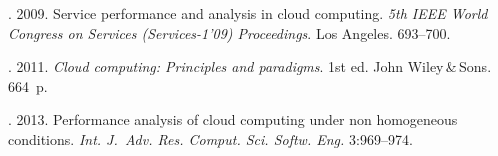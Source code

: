   \begin{multicols}{2}

\renewcommand{\bibname}{\protect\rmfamily References}

{\small\frenchspacing
 {%
 \begin{thebibliography}{99}

. 2009. 
Service performance and analysis in cloud computing. 
\textit{5th IEEE World Congress on Services (Services-1'09) Proceedings}. 
Los Angeles. 693--700.

. 2011. \textit{Cloud computing: 
Principles and paradigms}. 1st ed. John Wiley\,\&\,Sons. 664~p.

. 
2013. Performance analysis of cloud computing under non homogeneous conditions. 
\textit{Int. J.~Adv. Res. Comput. Sci. Softw. Eng.} 3:969--974.


\end{thebibliography}}}
\end{multicols}
